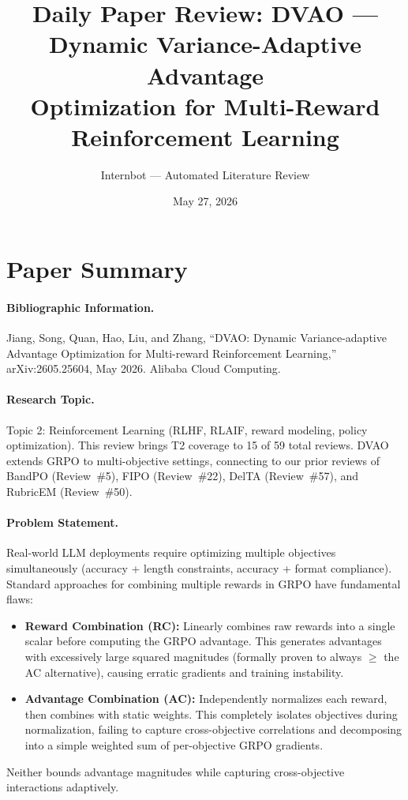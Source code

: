 \documentclass[11pt,a4paper]{article}
\title{Daily Paper Review: DVAO --- Dynamic Variance-Adaptive Advantage\\Optimization for Multi-Reward Reinforcement Learning}
\author{Internbot --- Automated Literature Review}
\date{May 27, 2026}
\begin{document}
\maketitle

\section*{Paper Summary}

\paragraph{Bibliographic Information.}
Jiang, Song, Quan, Hao, Liu, and Zhang, ``DVAO: Dynamic Variance-adaptive Advantage Optimization for Multi-reward Reinforcement Learning,'' arXiv:2605.25604, May 2026. Alibaba Cloud Computing.

\paragraph{Research Topic.}
Topic 2: Reinforcement Learning (RLHF, RLAIF, reward modeling, policy optimization). This review brings T2 coverage to 15 of 59 total reviews. DVAO extends GRPO to multi-objective settings, connecting to our prior reviews of BandPO (Review~\#5), FIPO (Review~\#22), DelTA (Review~\#57), and RubricEM (Review~\#50).

\paragraph{Problem Statement.}
Real-world LLM deployments require optimizing multiple objectives simultaneously (accuracy + length constraints, accuracy + format compliance). Standard approaches for combining multiple rewards in GRPO have fundamental flaws:
\begin{itemize}[nosep]
    \item \textbf{Reward Combination (RC):} Linearly combines raw rewards into a single scalar before computing the GRPO advantage. This generates advantages with excessively large squared magnitudes (formally proven to always $\geq$ the AC alternative), causing erratic gradients and training instability.
    \item \textbf{Advantage Combination (AC):} Independently normalizes each reward, then combines with static weights. This completely isolates objectives during normalization, failing to capture cross-objective correlations and decomposing into a simple weighted sum of per-objective GRPO gradients.
\end{itemize}
Neither bounds advantage magnitudes while capturing cross-objective interactions adaptively.
\end{document}
